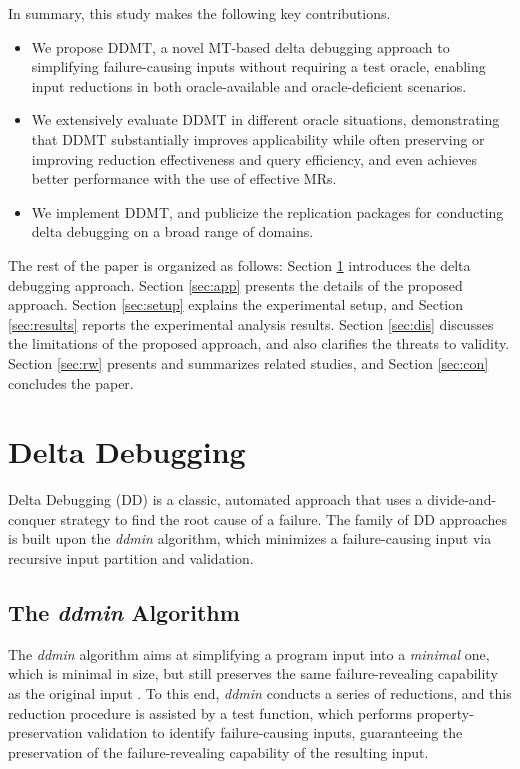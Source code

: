 In summary, this study makes the following key contributions.
\begin{itemize}
    \item We propose DDMT, a novel MT-based delta debugging approach to simplifying failure-causing inputs without requiring a test oracle, enabling input reductions in both oracle-available and oracle-deficient scenarios.

    \item We extensively evaluate DDMT in different oracle situations, demonstrating that DDMT substantially improves applicability while often preserving or improving reduction effectiveness and query efficiency, and even achieves better performance with the use of effective MRs.

    \item We implement DDMT, and publicize the replication packages for conducting delta debugging on a broad range of domains.
\end{itemize}

The rest of the paper is organized as follows:
Section \ref{sec:DD} introduces the delta debugging approach.
Section \ref{sec:app} presents the details of the proposed approach.
Section \ref{sec:setup} explains the experimental setup, and Section \ref{sec:results} reports the experimental analysis results.
Section \ref{sec:dis} discusses the limitations of the proposed approach, and also clarifies the threats to validity.
Section \ref{sec:rw} presents and summarizes related studies, and Section \ref{sec:con} concludes the paper.



\section{Delta Debugging}
\label{sec:DD}

Delta Debugging (DD) \cite{Zeller2002, zeller2009programs, zeller2025simplifying} is a classic, automated approach that uses a divide-and-conquer strategy to find the root cause of a failure.
The family of DD approaches is built upon the \emph{ddmin} algorithm, which minimizes a failure-causing input via recursive input partition and validation.

\subsection{The \emph{ddmin} Algorithm}
The \emph{ddmin} algorithm aims at simplifying a program input into
a \emph{minimal} one, which is minimal in size,
 but still preserves the same failure-revealing capability as the original input \cite{Zeller2002}. 
 To this end, \emph{ddmin} conducts a series of reductions, and this reduction procedure is assisted by a test function, which performs property-preservation validation to identify failure-causing inputs, guaranteeing the preservation of the failure-revealing capability of the resulting input.
  



